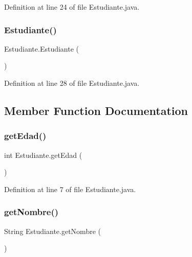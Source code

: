 Definition at line 24 of file Estudiante.\+java.

\mbox{\label{class_estudiante_a4eb8217a6432c3fc5f01d6ad0a534af1}} 
\subsubsection{\texorpdfstring{Estudiante()}{Estudiante()}\hspace{0.1cm}{\footnotesize\ttfamily [2/2]}}
{\footnotesize\ttfamily Estudiante.\+Estudiante (\begin{DoxyParamCaption}{ }\end{DoxyParamCaption})\hspace{0.3cm}{\ttfamily [inline]}}



Definition at line 28 of file Estudiante.\+java.



\subsection{Member Function Documentation}
\mbox{\label{class_estudiante_a03cc036ac2458b681a4b500357f8fca9}} 
\subsubsection{\texorpdfstring{get\+Edad()}{getEdad()}}
{\footnotesize\ttfamily int Estudiante.\+get\+Edad (\begin{DoxyParamCaption}{ }\end{DoxyParamCaption})\hspace{0.3cm}{\ttfamily [inline]}}



Definition at line 7 of file Estudiante.\+java.

\mbox{\label{class_estudiante_adfce6c01a636fa3d5b095fa772b71edf}} 
\subsubsection{\texorpdfstring{get\+Nombre()}{getNombre()}}
{\footnotesize\ttfamily String Estudiante.\+get\+Nombre (\begin{DoxyParamCaption}{ }\end{DoxyParamCaption})\hspace{0.3cm}{\ttfamily [inline]}}




